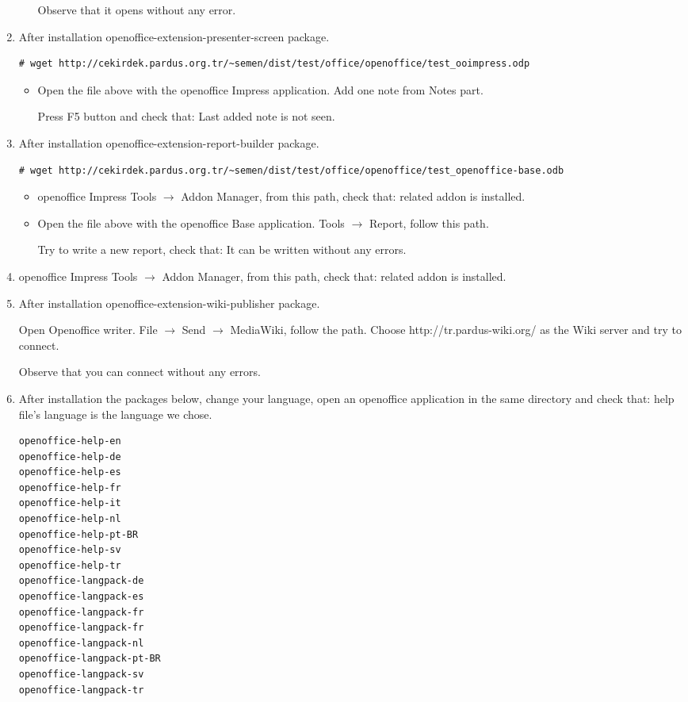 \documentclass[a4paper,10pt]{article}
\begin{document}
\begin{enumerate}
\begin{itemize}
Observe that it opens without any error.

\end{itemize}
 
\item After installation openoffice-extension-presenter-screen package.
\begin{verbatim}
# wget http://cekirdek.pardus.org.tr/~semen/dist/test/office/openoffice/test_ooimpress.odp
\end{verbatim}

\begin{itemize}


\item Open the file above with the openoffice Impress application. Add one note from Notes part. 

Press F5 button and check that: Last added note is not seen.

\end{itemize}
\item After installation openoffice-extension-report-builder package.
\begin{verbatim}
# wget http://cekirdek.pardus.org.tr/~semen/dist/test/office/openoffice/test_openoffice-base.odb
\end{verbatim}

\begin{itemize}
\item openoffice Impress Tools $\rightarrow$ Addon Manager, from this path, check that: related addon is installed.

\item Open the file above with the openoffice Base application. Tools $\rightarrow$ Report, follow this path.

Try to write a new report, check that: It can be written without any errors.

\end{itemize}
\item openoffice Impress Tools $\rightarrow$ Addon Manager, from this path, check that: related addon is installed.

\item After installation openoffice-extension-wiki-publisher package.

Open Openoffice writer. File $\rightarrow$ Send $\rightarrow$ MediaWiki, follow the path. Choose http://tr.pardus-wiki.org/ as the Wiki server   and try to connect.

Observe that you can connect without any errors.

\item After installation the packages below, change your language, open an openoffice application in the same directory and check that: help file's language is the language we chose.
\begin{verbatim}
openoffice-help-en 
openoffice-help-de
openoffice-help-es
openoffice-help-fr
openoffice-help-it
openoffice-help-nl
openoffice-help-pt-BR
openoffice-help-sv
openoffice-help-tr
openoffice-langpack-de
openoffice-langpack-es
openoffice-langpack-fr
openoffice-langpack-fr
openoffice-langpack-nl
openoffice-langpack-pt-BR
openoffice-langpack-sv
openoffice-langpack-tr


\end{verbatim}
\end{enumerate}
\end{document}
